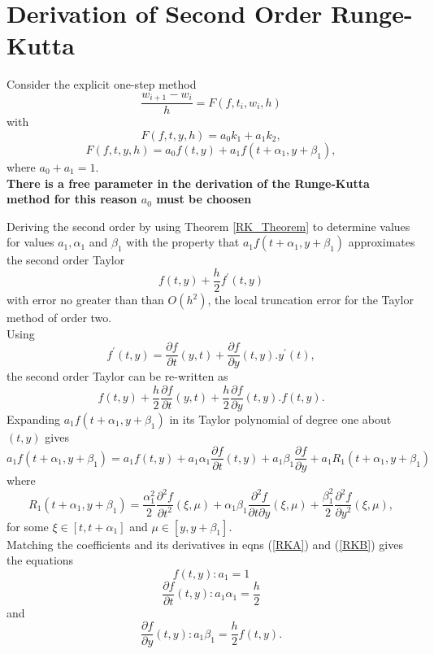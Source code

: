 \section{Derivation of Second Order Runge-Kutta}
Consider the explicit one-step method\\
\begin{equation}
\frac{w_{i+1}-w_i}{h}=F(f,t_i,w_i,h)
\end{equation}
with
\begin{equation}
F(f,t,y,h)=a_0k_1+a_1k_2,
\end{equation}
\begin{equation}
F(f,t,y,h)=a_0f(t,y)+a_1f(t+\alpha_1,y+\beta_1),
\end{equation}
where $a_0+a_1=1.$\\
\textbf{There is a free parameter in the derivation of the Runge-Kutta method for this reason $a_0$ must be choosen}

Deriving the second order  by using Theorem \ref{RK_Theorem} to determine values for values  $a_1,\alpha_1$ and $\beta_1$ with the property that $a_1f(t+\alpha_1,y+\beta_1)$ approximates the second order Taylor
\[f(t,y)+\frac{h}{2}f^{'}(t,y) \]
with error no greater than than $O(h^2)$, the local truncation error for
the Taylor method of order two.\\
Using
\[f^{'}(t,y)=\frac{\partial f}{\partial t}(y,t)+\frac{\partial f}{\partial y}(t,y).y^{'}(t), \]
the second order Taylor can be re-written as
\begin{equation}
\label{RKA}
f(t,y)+\frac{h}{2}\frac{\partial f}{\partial t}(y,t)+\frac{h}{2}\frac{\partial f}{\partial y}(t,y).f(t,y).
\end{equation}
Expanding $a_1f(t+\alpha_1,y+\beta_1)$ in its Taylor polynomial of degree one about
$(t,y)$ gives
\begin{equation}
\label{RKB}
a_1f(t+\alpha_1,y+\beta_1)= a_1 f(t,y) +a_1 \alpha_1 \frac{\partial f}{\partial t}(t,y)+a_1 \beta_1\frac{\partial f}{\partial y}+a_1R_1(t+\alpha_1,y+\beta_1)
\end{equation}
where
\[ R_1(t+\alpha_1,y+\beta_1)=\frac{\alpha_1^2}{2}\frac{\partial^2 f}{\partial t ^2}(\xi,\mu)
+\alpha_1 \beta_1 \frac{\partial^2 f}{\partial t \partial y}(\xi,\mu)
+\frac{\beta_1^2}{2}\frac{\partial^2 f}{\partial y^2} (\xi,\mu),
\]for some $\xi \in [t,t+\alpha_1]$ and $\mu \in [y,y+\beta_1]$.\\
Matching the coefficients and its derivatives in eqns (\ref{RKA}) and (\ref{RKB}) 
gives the equations
\[f(t,y): a_1=1\]
\[\frac{\partial f }{\partial t}(t,y): a_1\alpha_1=\frac{h}{2} \]
and
\[\frac{\partial f }{\partial y}(t,y): a_1\beta_1=\frac{h}{2}f(t,y). \]

